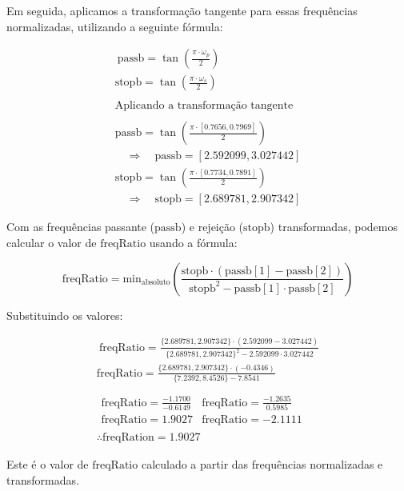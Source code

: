 Em seguida, aplicamos a transformação tangente para essas frequências normalizadas, utilizando a seguinte fórmula:

\begin{align*} \
    \text{passb} = \tan\left(\frac{\pi \cdot \omega_p}{2}\right)         \\
    \text{stopb} = \tan\left(\frac{\pi \cdot \omega_s}{2}\right)         \\
    \\
    \text{Aplicando a transformação tangente}                            \\
    \\
    \text{passb} = \tan\left(\frac{\pi \cdot [0.7656, 0.7969]}{2}\right) \\ \quad \Rightarrow \quad \text{passb} = [2.592099, 3.027442] \\
    \text{stopb} = \tan\left(\frac{\pi \cdot [0.7734, 0.7891]}{2}\right) \\ \quad \Rightarrow \quad \text{stopb} = [2.689781, 2.907342]
\end{align*}


Com as frequências passante ($\text{passb}$) e rejeição ($\text{stopb}$) transformadas, podemos calcular o valor de $\text{freqRatio}$ usando a fórmula:

$$
    \text{freqRatio} = \text{min}_{\text{absoluto}} \left(\frac{\text{stopb} \cdot (\text{passb}[1] - \text{passb}[2])}{\text{stopb}^2 - \text{passb}[1] \cdot \text{passb}[2]} \right)
$$

Substituindo os valores:

\begin{align*} \
    \text{freqRatio} = \frac{\{2.689781, 2.907342\} \cdot (2.592099 - 3.027442)}{\{2.689781, 2.907342\}^2 - 2.592099 \cdot 3.027442} \\
    \text{freqRatio} = \frac{\{2.689781, 2.907342\} \cdot (-0.4346)}{\{7.2392, 8.4526\} - 7.8541}                      \\
    \\
    \begin{array}{cc}
        \text{freqRatio} = \frac{-1.1700}{-0.6149} & \text{freqRatio} = \frac{-1.2635}{0.5985} \\
        \text{freqRatio} = 1.9027                  & \text{freqRatio} = -2.1111
    \end{array}
    \\
    \therefore \text{freqRation} = 1.9027
\end{align*}

Este é o valor de $\text{freqRatio}$ calculado a partir das frequências normalizadas e transformadas.

